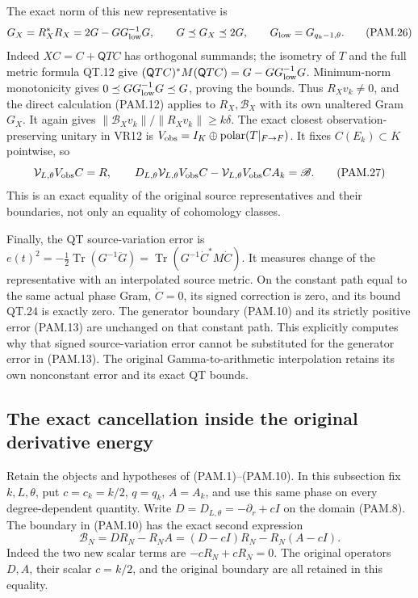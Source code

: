 The exact norm of this new representative is
\[
 G_X=R_X^*R_X
       =2G-GG_{\rm low}^{-1}G,\qquad
 G\preceq G_X\preceq2G,\qquad
 G_{\rm low}=G_{q_k-1,\theta}.
 \tag{PAM.26}\label{CFStage:eq:pam-repairgram}
\]
Indeed \(XC=C+\mathsf QTC\) has orthogonal summands; the
isometry of \(T\) and the full metric formula QT.12 give
\((\mathsf QTC)^*M(\mathsf QTC)=G-GG_{\rm low}^{-1}G\).
Minimum-norm monotonicity gives
\(0\preceq GG_{\rm low}^{-1}G\preceq G\), proving the bounds.
Thus \(R_Xv_k\ne0\), and the direct calculation (PAM.12) applies
to \(R_X,\mathscr B_X\) with its own unaltered Gram \(G_X\).
It again gives
\(\|\mathscr B_Xv_k\|/\|R_Xv_k\|\ge k\delta\).
The exact closest observation-preserving unitary in VR12 is
\(V_{\rm obs}=I_K\oplus\operatorname{polar}(T|_{F\to F})\).
It fixes \(C(E_k)\subset K\) pointwise, so
\[
 \mathcal V_{L,\theta}V_{\rm obs}C=R,\qquad
 D_{L,\theta}\mathcal V_{L,\theta}V_{\rm obs}C
       -\mathcal V_{L,\theta}V_{\rm obs}CA_k=\mathscr B .
 \tag{PAM.27}\label{CFStage:eq:pam-unitary}
\]
This is an exact equality of the original source representatives
and their boundaries, not only an equality of cohomology classes.

Finally, the QT source-variation error is
\(e(t)^2=-\tfrac12\operatorname{Tr}(G^{-1}\ddot G)
=\operatorname{Tr}(G^{-1}\dot C^*M\dot C)\).
It measures change of the representative with an interpolated
source metric. On the constant path equal to the same actual
phase Gram, \(\dot C=0\), its signed correction is zero, and its
bound QT.24 is exactly zero. The generator boundary (PAM.10)
and its strictly positive error (PAM.13) are unchanged on that
constant path. This explicitly computes why that signed
source-variation error cannot be substituted for the generator
error in (PAM.13). The original Gamma-to-arithmetic interpolation
retains its own nonconstant error and its exact QT bounds.

\subsection{The exact cancellation inside the original derivative energy}
\label{CFStage:sec:psc-centered}

Retain the objects and hypotheses of (PAM.1)--(PAM.10). In this
subsection fix \(k,L,\theta\), put \(c=c_k=k/2\), \(q=q_k\),
\(A=A_k\), and use this same phase on every degree-dependent
quantity. Write \(D=D_{L,\theta}=-\partial_r+cI\) on the domain
(PAM.8). The boundary in (PAM.10) has the exact second expression
\[
 \mathscr B_N=DR_N-R_NA
       =(D-cI)R_N-R_N(A-cI).
 \tag{PSC.1}\label{CFStage:eq:psc-centeredboundary}
\]
Indeed the two new scalar terms are \(-cR_N+cR_N=0\).
The original operators \(D,A\), their scalar \(c=k/2\), and
the original boundary are all retained in this equality.

